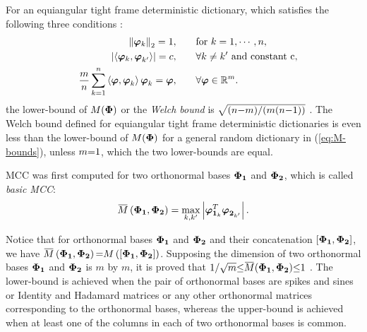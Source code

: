 For an equiangular tight frame deterministic dictionary, which satisfies the following three conditions \cite{Foucart2013}:
\begin{equation*}
\begin{aligned}
&&\left\lVert\boldsymbol{\varphi}_k\right\rVert_2 = 1, \qquad & \text{for } k = 1, \cdots, n, \\
&&\left\lvert\left\langle \boldsymbol{\varphi}_k , \boldsymbol{\varphi}^{ }_{k'} \right\rangle\right\rvert=c, \qquad & \forall k \neq k' \text{ and constant c}, \\
&&\frac{m}{n} \sum_{k=1}^n \left\langle \boldsymbol{\varphi} , \boldsymbol{\varphi}^{ }_{k} \right\rangle \boldsymbol{\varphi}^{ }_{k} = \boldsymbol{\varphi}, \qquad & \forall \boldsymbol{\varphi} \in \mathbb{R}^m.
\end{aligned}
\end{equation*}
the lower-bound of $M(\boldsymbol{\Phi})$ or the \emph{Welch bound} is $\sqrt{(n {-} m)/(m(n {-} 1))}$ \cite{Welch1974,Strohmer2003}.
The Welch bound defined for equiangular tight frame deterministic dictionaries is even less than the lower-bound of $M(\boldsymbol{\Phi})$ for a general random dictionary in (\ref{eq:M-bounds}), unless $m {=} 1$,  which the two lower-bounds are equal.

MCC was first computed for two orthonormal bases $\boldsymbol{\Phi}_{\boldsymbol{1}}$ and $\boldsymbol{\Phi}_{\boldsymbol{2}}$, 
which is called \emph{basic MCC}:
\begin{equation*}
\overbar{M} \myparanthese{\myPhiOne,\myPhiTwo} = \max_{k,k'} \myabs{\boldsymbol{\varphi}_{{\boldsymbol{1}}_k}^T \boldsymbol{\varphi}_{{\boldsymbol{2}}_{k'}}^{ }}.
\end{equation*}

{
\label{txt:BasicMCCBounds} 
Notice that for orthonormal bases $\boldsymbol{\Phi}_{\boldsymbol{1}}$ and $\boldsymbol{\Phi}_{\boldsymbol{2}}$ and their concatenation $[\boldsymbol{\Phi}_{\boldsymbol{1}} , \boldsymbol{\Phi}_{\boldsymbol{2}}]$, we have $\overbar{M}\myparanthese{\myPhiOne,\myPhiTwo} \seq M\myparanthese{\mybracket{\myPhiOne,\myPhiTwo}}$.
Supposing the dimension of two orthonormal bases $\boldsymbol{\Phi}_{\boldsymbol{1}}$ and $\boldsymbol{\Phi}_{\boldsymbol{2}}$ is $m$ by $m$, it is proved that $1/\sqrt{m} \sleq \overbar{M}(\myPhiOne,\myPhiTwo) \sleq 1$ \cite{Donoho2001,Elad2001,Elad2002a}.
The lower-bound is achieved when the pair of orthonormal bases are spikes and sines \cite{Donoho2001} or Identity and Hadamard \cite{Elad2002a} matrices or any other orthonormal matrices corresponding to the orthonormal bases, whereas the upper-bound is achieved when at least one of the columns in each of two orthonormal bases is common.
}